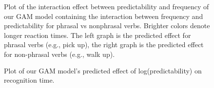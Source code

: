 \documentclass[
  authoryear,
  preprint,
  1p,
  onecolumn]{elsarticle}
\begin{document}
\begin{figure}


\caption{\label{fig-gam2dplot2}Plot of the interaction effect between
predictability and frequency of our GAM model containing the interaction
between frequency and predictability for phrasal vs nonphrasal verbs.
Brighter colors denote longer reaction times. The left graph is the
predicted effect for phrasal verbs (e.g., pick up), the right graph is
the predicted effect for non-phrasal verbs (e.g., walk up).}

\end{figure}%

\begin{figure}


\caption{\label{fig-gammodelinterplot}Plot of our GAM model's predicted
effect of log(predictability) on recognition time.}

\end{figure}%
\end{document}
